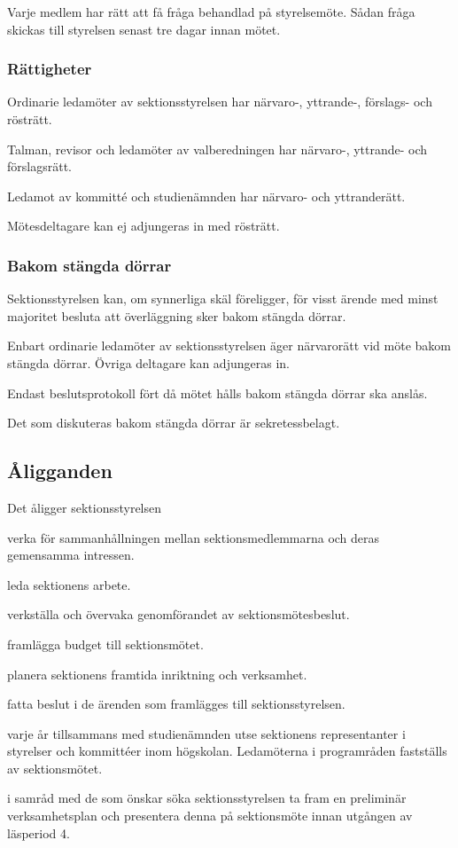 \documentclass{styrdokument}
\begin{document}
\? Varje medlem har rätt att få fråga behandlad på styrelsemöte.
Sådan fråga skickas till styrelsen senast tre dagar innan mötet.

\subsubsection{Rättigheter}
\? Ordinarie ledamöter av sektionsstyrelsen har närvaro-, yttrande-, förslags- och rösträtt. 

\? Talman, revisor och ledamöter av valberedningen har närvaro-, yttrande- och förslagsrätt.
		
\? Ledamot av kommitté och studienämnden har närvaro- och yttranderätt.
		
\? Mötesdeltagare kan ej adjungeras in med rösträtt.

\subsubsection{Bakom stängda dörrar}
\? Sektionsstyrelsen kan, om synnerliga skäl föreligger, för visst ärende med minst  majoritet besluta att överläggning sker bakom stängda dörrar.

\? Enbart ordinarie ledamöter av sektionsstyrelsen äger närvarorätt vid möte bakom stängda dörrar.
Övriga deltagare kan adjungeras in.

\? Endast beslutsprotokoll fört då mötet hålls bakom stängda dörrar ska anslås.

\? Det som diskuteras bakom stängda dörrar är sekretessbelagt.

\subsection{Åligganden}
\? Det åligger sektionsstyrelsen
\begin{aligganden}
    \item verka för sammanhållningen mellan sektionsmedlemmarna och deras gemensamma intressen.
	\item leda sektionens arbete.
	\item verkställa och övervaka genomförandet av sektionsmötesbeslut.
	\item framlägga budget till sektionsmötet.
	\item planera sektionens framtida inriktning och verksamhet.
	\item fatta beslut i de ärenden som framlägges till sektionsstyrelsen.
	\item varje år tillsammans med studienämnden utse sektionens representanter i styrelser och kommittéer inom högskolan.
	    Ledamöterna i programråden fastställs av sektionsmötet.
	\item i samråd med de som önskar söka sektionsstyrelsen ta fram en preliminär verksamhetsplan och presentera denna på sektionsmöte innan utgången av läsperiod 4.
\end{aligganden}
\end{document}
